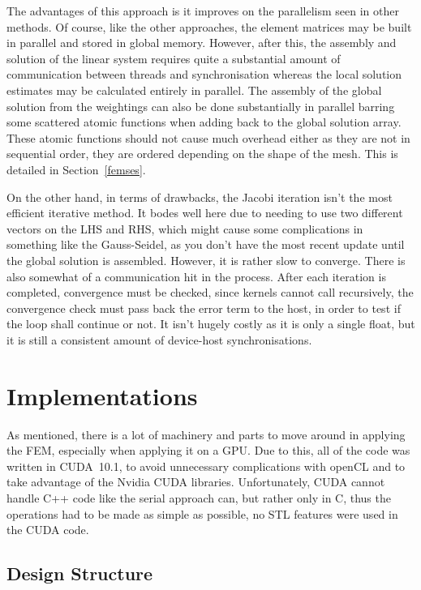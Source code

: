The advantages of this approach is it improves on the parallelism seen in other methods. Of course, like the other approaches, the element matrices may be built in parallel and stored in global memory. However, after this, the assembly and solution of the linear system requires quite a substantial amount of communication between threads and synchronisation whereas the local solution estimates may be calculated entirely in parallel. The assembly of the global solution from the weightings can also be done substantially in parallel barring some scattered atomic functions when adding back to the global solution array. These atomic functions should not cause much overhead either as they are not in sequential order, they are ordered depending on the shape of the mesh. This is detailed in Section~\ref{femses}.

On the other hand, in terms of drawbacks, the Jacobi iteration isn't the most efficient iterative method. It bodes well here due to needing to use two different vectors on the LHS and RHS, which might cause some complications in something like the Gauss-Seidel, as you don't have the most recent update until the global solution is assembled. However, it is rather slow to converge. There is also somewhat of a communication hit in the process. After each iteration is completed, convergence must be checked, since kernels cannot call recursively, the convergence check must pass back the error term to the host, in order to test if the loop shall continue or not. It isn't hugely costly as it is only a single float, but it is still a consistent amount of device-host synchronisations.

\section{Implementations}\label{gpucode}

As mentioned, there is a lot of machinery and parts to move around in applying the FEM, especially when applying it on a GPU. Due to this, all of the code was written in CUDA~10.1, to avoid unnecessary complications with openCL and to take advantage of the Nvidia CUDA libraries. Unfortunately, CUDA cannot handle C++ code like the serial approach can, but rather only in C, thus the operations had to be made as simple as possible, no STL features were used in the CUDA code. 

\subsection{Design Structure}

